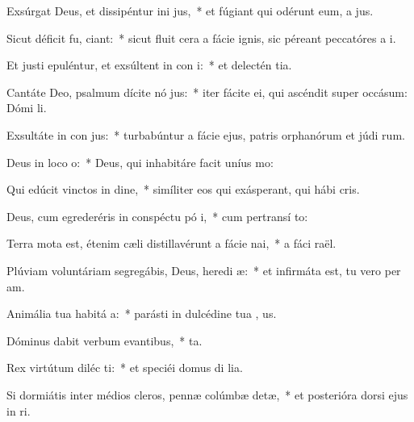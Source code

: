 \item Exsúrgat Deus, et dissipéntur ini jus,~* et fúgiant qui odérunt eum, a  jus.
\item Sicut déficit fu, ciant:~* sicut fluit cera a fácie ignis, sic péreant peccatóres a  i.
\item Et justi epuléntur, et exsúltent in con i:~* et delectén  tia.
\item Cantáte Deo, psalmum dícite nó jus:~* iter fácite ei, qui ascéndit super occásum: Dómi  li.
\item Exsultáte in con jus:~* turbabúntur a fácie ejus, patris orphanórum et júdi rum.
\item Deus in loco  o:~* Deus, qui inhabitáre facit uníus   mo:
\item Qui edúcit vinctos in dine,~* simíliter eos qui exásperant, qui hábi  cris.
\item Deus, cum egrederéris in conspéctu pó i,~* cum pertransí  to:
\item Terra mota est, étenim cæli distillavérunt a fácie  nai,~* a fáci  raël.
\item Plúviam voluntáriam segregábis, Deus, heredi æ:~* et infirmáta est, tu vero per am.
\item Animália tua habitá  a:~* parásti in dulcédine tua , us.
\item Dóminus dabit verbum evantibus,~*  ta.
\item Rex virtútum diléc ti:~* et speciéi domus di lia.
\item Si dormiátis inter médios cleros, pennæ colúmbæ detæ,~* et posterióra dorsi ejus in  ri.
